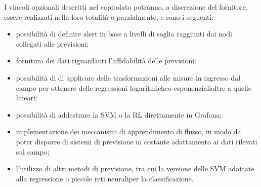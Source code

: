 	 	I vincoli opzionali descritti nel capitolato potranno, a discrezione del fornitore, essere realizzati nella loro totalità o parzialmente, e sono i seguenti:
		\begin{itemize}
			\item possibilità di definire alert in base a livelli di soglia raggiunti dai nodi collegati alle previsioni;
			\item fornitura dei dati riguardanti l’affidabilità delle previsioni;
			\item possibilità di di applicare delle trasformazioni alle misure in ingresso dal campo per ottenere delle regressioni logaritmiche\glo o esponenziali\glo oltre a quelle lineari;
			\item possibilità di addestrare la SVM o la RL direttamente in Grafana;
			\item implementazione dei meccanismi di apprendimento di flusso, in modo da poter disporre di sistemi di previsione in costante adattamento ai dati rilevati sul campo;
			\item l’utilizzo di altri metodi di previsione, tra cui la versione delle SVM adattate alla regressione o piccole reti neurali\glo per la classificazione\glo.

		\end{itemize}